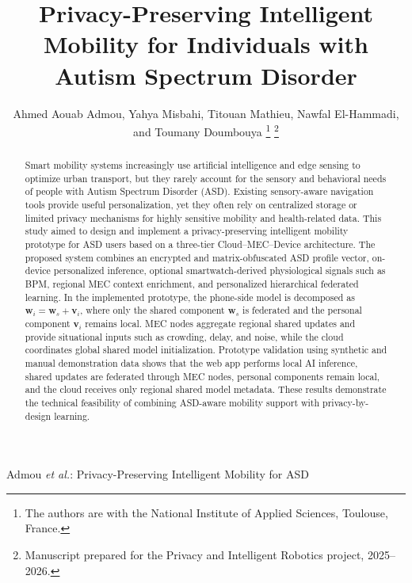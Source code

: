 \documentclass[lettersize,journal]{IEEEtran}
\begin{document}
\title{Privacy-Preserving Intelligent Mobility for Individuals with
       Autism Spectrum Disorder}

\author{Ahmed Aouab Admou, Yahya Misbahi, Titouan Mathieu,
        Nawfal El-Hammadi, and Toumany Doumbouya%
\thanks{The authors are with the National Institute of Applied Sciences,
Toulouse, France.}
\thanks{Manuscript prepared for the Privacy and Intelligent Robotics
project, 2025--2026.}}

%
{Admou \MakeLowercase{\textit{et al.}}: Privacy-Preserving Intelligent Mobility for ASD}

\maketitle

\begin{abstract}
Smart mobility systems increasingly use artificial intelligence and
edge sensing to optimize urban transport, but they rarely account for
the sensory and behavioral needs of people with Autism Spectrum
Disorder (ASD). Existing sensory-aware navigation tools provide useful
personalization, yet they often rely on centralized storage or limited
privacy mechanisms for highly sensitive mobility and health-related
data. This study aimed to design and implement a privacy-preserving
intelligent mobility prototype for ASD users based on a three-tier
Cloud--MEC--Device architecture. The proposed system combines an
encrypted and matrix-obfuscated ASD profile vector, on-device
personalized inference, optional smartwatch-derived physiological
signals such as BPM, regional MEC context enrichment, and personalized
hierarchical federated learning. In the implemented
prototype, the phone-side model is decomposed as
$\mathbf{w}_i=\mathbf{w}_s+\mathbf{v}_i$, where only the shared
component $\mathbf{w}_s$ is federated and the personal component
$\mathbf{v}_i$ remains local. MEC nodes aggregate regional shared
updates and provide situational inputs such as crowding, delay, and
noise, while the cloud coordinates global shared model initialization.
Prototype validation using synthetic and manual demonstration data
shows that the web app performs local AI inference, shared updates are
federated through MEC nodes, personal components remain local, and the
cloud receives only regional shared model metadata. These results
demonstrate the technical feasibility of combining ASD-aware mobility
support with privacy-by-design learning.
\end{abstract}
\end{document}
